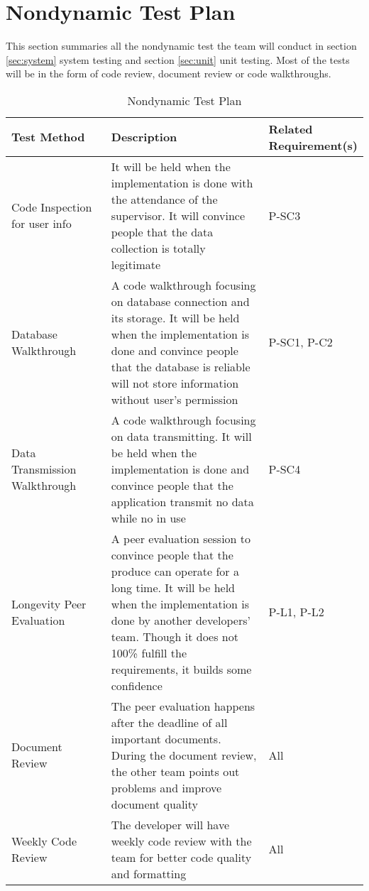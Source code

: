 \documentclass[12pt, titlepage]{article}
\begin{document}
\section{Nondynamic Test Plan}

This section summaries all the nondynamic test the team will conduct in section \ref{sec:system} system testing and section \ref{sec:unit} unit testing. Most of the tests will be in the form of code review,  document review or code walkthroughs.
\begin{table}[H]
\caption{Nondynamic Test Plan}
\begin{tabular}{|p{0.3\linewidth} | p{0.5\linewidth}| p{0.2\linewidth} |}
\hline
\multicolumn{1}{|l}{\bfseries Test Method} & \multicolumn{1}{|l|}{\bfseries Description} & \multicolumn{1}{l|}{\bfseries Related Requirement(s)}\\
\hline
Code Inspection for user info & It will be held when the implementation is done with the attendance of the supervisor. It will convince people that the data collection is totally legitimate & P-SC3 \\
\hline
Database Walkthrough & A code walkthrough focusing on database connection and its storage. It will be held when the implementation is done and convince people that the database is reliable will not store information without user's permission & P-SC1, P-C2 \\
\hline
Data Transmission Walkthrough & A code walkthrough focusing on data transmitting. It will be held when the implementation is done and convince people that the application transmit no data while no in use & P-SC4 \\
\hline
Longevity Peer Evaluation & A peer evaluation session to convince people that the produce can operate for a long time. It will be held when the implementation is done by another developers' team. Though it does not 100\% fulfill the requirements, it builds some confidence & P-L1, P-L2\\
\hline
Document Review & The peer evaluation happens after the deadline of all important documents. During the document review, the other team points out problems and improve document quality & All\\
\hline
Weekly Code Review & The developer will have weekly code review with the team for better code quality and formatting & All\\
\hline
\end{tabular}
\end{table}

\newpage
\end{document}
